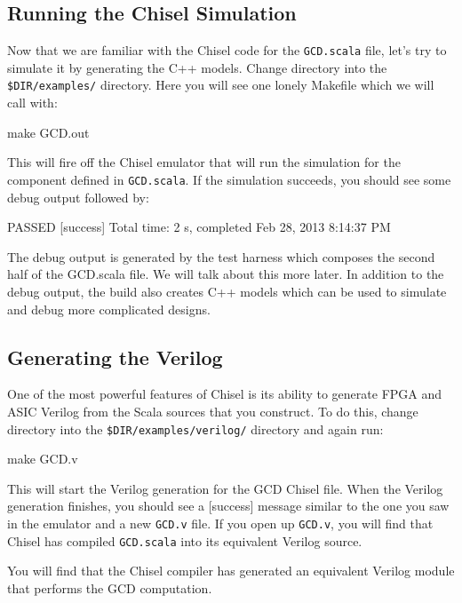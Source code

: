 \subsection{Running the Chisel Simulation}

Now that we are familiar with the Chisel code for the \verb+GCD.scala+ file, let's try to simulate it by generating the C++ models. Change directory into the \verb+$DIR/examples/+ directory. Here you will see one lonely Makefile which we will call with:

\begin{bash}
make GCD.out
\end{bash}

\noindent
This will fire off the Chisel emulator that will run the simulation for the component defined in \verb+GCD.scala+. If the simulation succeeds, you should see some debug output followed by:
\begin{footnotesize}
\begin{bash}
PASSED
[success] Total time: 2 s, completed Feb 28, 2013 8:14:37 PM
\end{bash}
\end{footnotesize}

The debug output is generated by the test harness which composes the second half of the GCD.scala file. We will talk about this more later. In addition to the debug output, the build also creates C++ models which can be used to simulate and debug more complicated designs.

\subsection{Generating the Verilog}

One of the most powerful features of Chisel is its ability to generate FPGA and ASIC Verilog from the Scala sources that you construct. To do this, change directory into the \verb+$DIR/examples/verilog/+ directory and again run:
\begin{bash}
make GCD.v
\end{bash}
This will start the Verilog generation for the GCD Chisel file. When the Verilog generation finishes, you should see a [success] message similar to the one you saw in the emulator and a new \verb+GCD.v+ file. If you open up \verb+GCD.v+, you will find that Chisel has compiled \verb+GCD.scala+ into its equivalent Verilog source.

You will find that the Chisel compiler has generated an equivalent Verilog module that performs the GCD computation.

